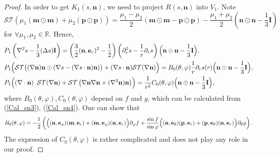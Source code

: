 \documentclass[10pt, a4paper]{article}
\newcommand\n{\mathbf{n}}
\newcommand\e{\mathbf{e}}
\newcommand\m{\mathbf{m}}
\newcommand\p{\mathbf{p}}
\newcommand\pp{\partial}
\begin{document}
\begin{proof}
In order to get $K_1(s, \n)$, we need to project $R(s, \n)$ into $V_1$. Note
\begin{equation}
\mathcal{ST} \left( \mu_1 (\m \odot \m) + \mu_2 (\p \odot \p) \right) =  \dfrac{\mu_1 - \mu_2}{2} \left( \m \odot \m - \p \odot \p \right) - \dfrac{\mu_1 + \mu_2}{2} \left( \n \odot \n - \dfrac{1}{3} \mathbf{I} \right)
\end{equation}
for $\forall \mu_1, \mu_2 \in \mathbb{R}$. Hence,
\begin{equation}
\begin{aligned}
& P_1 \left( \nabla^2 s - \frac{1}{3} (\Delta s) \mathbf{I} \right) = \left( \frac{3}{2} (\n, \e_r)^2 - \frac{1}{2} \right) \left( \pp_r^2 s - \frac{1}{r} \pp_r s \right)  \Bigl( \n \odot \n - \frac{1}{3} \mathbf{I} \Bigr), \\
&  P_1 \Bigl( \mathcal{ST}  \bigl( (\nabla \n) \n \odot (\nabla s - (\nabla s \cdot \n)  \n) \bigr)  + (\nabla s \cdot \n) \mathcal{ST}(\nabla \n) \Bigr)
=  B_0 (\theta, \varphi) \frac{1}{r} \pp_r s(r) \Bigl( \n \odot \n - \frac{1}{3} \mathbf{I} \Bigr), \\
& P_1  \Bigl( \left( \nabla \cdot \n \right) ~ \mathcal{ST} (\nabla \n) + \mathcal{ST}\left( \nabla \n \nabla \n + (\nabla^2 \n)\n \right) \Bigr) =  \frac{1}{r^2}C_0(\theta, \varphi) \Bigl( \n \odot \n - \frac{1}{3} \mathbf{I} \Bigr), \\
\end{aligned}
\end{equation}
where $B_0 (\theta, \varphi), C_0(\theta, \varphi)$ depend on $f$ and $g$, which can be calculated from (\ref{Cal_sn3}), (\ref{Cal_sn4}). %
One can show that
\begin{equation}
B_0(\theta, \varphi) = - \dfrac{1}{2}\left( \Bigl( (\n, \e_{\varphi})(\m, \e_r) + (\m, \e_{\varphi})(\n, \e_r) \Bigr) \pp_{\varphi} f  + \frac{\sin f}{\sin \varphi} \Bigl( (\n, \e_{\theta})(\p, \e_r) + (\p, \e_{\theta})(\n, \e_r)  \Bigr) \pp_{\theta} g \right).
\end{equation}
The expression of $C_0(\theta, \varphi)$ is rather complicated and does not play any role in our proof.


\end{proof}
\end{document}
